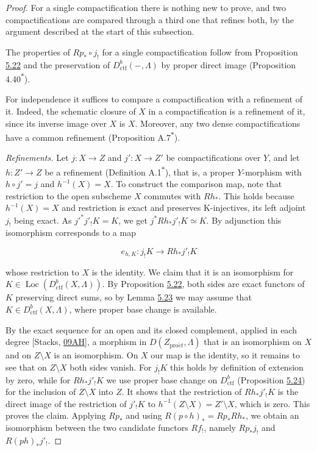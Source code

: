 \documentclass[11pt]{article}
\newcommand{\bpout}[1]{#1\textsuperscript{\hyperlink{bp-outside}{\ensuremath{\ast}}}}
\providecommand{\Loc}{}\renewcommand{\Loc}{\operatorname{Loc}}
\begin{document}
\begin{proof}[{Proof}]\label{bp87}%
For a single compactification there is nothing new to prove, and two compactifications are compared through a third one that refines both, by the argument described at the start of this subsection.

The properties of \(Rp_*\circ j_!\) for a single compactification follow from Proposition \hyperref[bp76]{5.22} and the preservation of \(D^b_{\mathrm{ctf}}(-,\Lambda)\) by proper direct image (Proposition \bpout{4.40}).

For independence it suffices to compare a compactification with a refinement of it. Indeed, the schematic closure of \(X\) in a compactification is a refinement of it, since its inverse image over \(X\) is \(X\). Moreover, any two dense compactifications have a common refinement (Proposition \bpout{A.7}).

\emph{Refinements.} Let \(j:X\to Z\) and \(j':X\to Z'\) be compactifications over \(Y\), and let \(h:Z'\to Z\) be a refinement (Definition \bpout{A.1}), that is, a proper \(Y\)-morphism with \(h\circ j'=j\) and \(h^{-1}(X)=X\). To construct the comparison map, note that restriction to the open subscheme \(X\) commutes with \(Rh_*\). This holds because \(h^{-1}(X)=X\) and restriction is exact and preserves K-injectives, its left adjoint \(j_!\) being exact. As \(j'^*j'_!K=K\), we get \(j^*Rh_*j'_!K\simeq K\). By adjunction this isomorphism corresponds to a map

\[
e_{h,K}:j_!K\longrightarrow Rh_*j'_!K
\tag{5.7}
\]

whose restriction to \(X\) is the identity. We claim that it is an isomorphism for \(K\in\Loc(D^b_{\mathrm{ctf}}(X,\Lambda))\). By Proposition \hyperref[bp76]{5.22}, both sides are exact functors of \(K\) preserving direct sums, so by Lemma \hyperref[bp79]{5.23} we may assume that \(K\in D^b_{\mathrm{ctf}}(X,\Lambda)\), where proper base change is available.

By the exact sequence for an open and its closed complement, applied in each degree [Stacks, \href{https://stacks.math.columbia.edu/tag/09AH}{09AH}], a morphism in \(D(Z_{\mathrm{pro}\acute{e}t},\Lambda)\) that is an isomorphism on \(X\) and on \(Z\setminus X\) is an isomorphism. On \(X\) our map is the identity, so it remains to see that on \(Z\setminus X\) both sides vanish. For \(j_!K\) this holds by definition of extension by zero, while for \(Rh_*j'_!K\) we use proper base change on \(D^b_{\mathrm{ctf}}\) (Proposition \hyperref[bp82]{5.24}) for the inclusion of \(Z\setminus X\) into \(Z\). It shows that the restriction of \(Rh_*j'_!K\) is the direct image of the restriction of \(j'_!K\) to \(h^{-1}(Z\setminus X)=Z'\setminus X\), which is zero. This proves the claim. Applying \(Rp_*\) and using \(R(p\circ h)_*=Rp_*Rh_*\), we obtain an isomorphism between the two candidate functors \(Rf_!\), namely \(Rp_*j_!\) and \(R(ph)_*j'_!\).


\end{proof}
\end{document}
